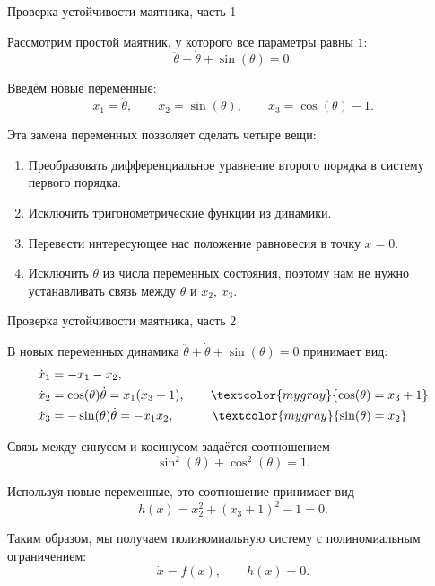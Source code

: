 \documentclass{beamer}
\begin{document}
\begin{frame}{Проверка устойчивости маятника, часть 1}
	\begin{flushleft}
		Рассмотрим простой маятник, у которого все параметры равны $1$:
		\[
		\ddot{\theta}+\dot{\theta}+\sin(\theta)=0.
		\]
		
		\bigskip
		
		Введём новые переменные:
		\[
		x_1=\dot{\theta},
		\qquad
		x_2=\sin(\theta),
		\qquad
		x_3=\cos(\theta)-1.
		\]
		
		\bigskip
		
		Эта замена переменных позволяет сделать четыре вещи:
		
		\begin{enumerate}
			\item Преобразовать дифференциальное уравнение второго порядка в систему первого порядка.
			
			\item Исключить тригонометрические функции из динамики.
			
			\item Перевести интересующее нас положение равновесия в точку $x=0$.
			
			\item Исключить $\theta$ из числа переменных состояния, поэтому нам не нужно устанавливать связь между $\theta$ и $x_2$, $x_3$.
		\end{enumerate}
	\end{flushleft}
	
\end{frame}


\begin{frame}{Проверка устойчивости маятника, часть 2}
	\begin{flushleft}
		В новых переменных динамика $\ddot{\theta}+\dot{\theta}+\sin(\theta)=0$ принимает вид:
		\[
		\begin{aligned}
			\dot{x}_1 &= -x_1-x_2, \\
			\dot{x}_2 &= \cos(\theta)\dot{\theta} = x_1(x_3+1), \qquad  \textcolor{mygray}{\cos(\theta)=x_3+1} \\
			\dot{x}_3 &= -\sin(\theta)\dot{\theta} = -x_1x_2,  \qquad \quad  \textcolor{mygray}{\sin(\theta)=x_2}
		\end{aligned}
		\]
		
		
		\bigskip
		
		Связь между синусом и косинусом задаётся соотношением
		\[
		\sin^2(\theta)+\cos^2(\theta)=1.
		\]
		
		Используя новые переменные, это соотношение принимает вид
		\[
		h(x)
		=
		x_2^2+(x_3+1)^2-1
		=0.
		\]
		
		\bigskip
		
		Таким образом, мы получаем полиномиальную систему с полиномиальным ограничением:
		\[
		\boxed{
			\dot{x}=f(x),
			\qquad
			h(x)=0.
		}
		\]
	\end{flushleft}
\end{frame}
\end{document}
